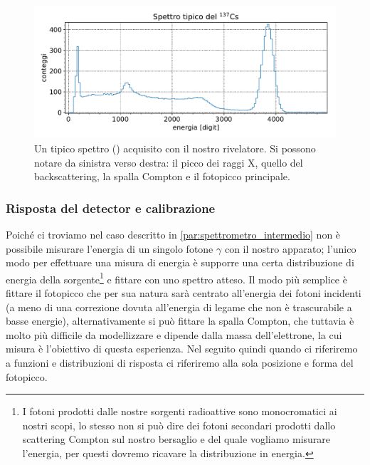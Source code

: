  \begin{figure}[h]
	\centering
	\includegraphics[width=\textwidth]{spettro_tipico}
	\caption{\label{fig:spettro_tipico}Un tipico spettro (\cs) acquisito con il nostro rivelatore. Si possono notare da sinistra verso destra: il picco dei raggi X, quello del backscattering, la spalla Compton e il fotopicco principale.}
\end{figure}


 \subsubsection{Risposta del detector e calibrazione}
 Poiché ci troviamo nel caso descritto in \autoref{par:spettrometro_intermedio} non è possibile misurare l'energia di un singolo fotone $\gamma$ con il nostro apparato; l'unico modo per effettuare una misura di energia è supporre una certa distribuzione di energia della sorgente\footnote{I fotoni prodotti dalle nostre sorgenti radioattive sono monocromatici ai nostri scopi, lo stesso non si può dire dei fotoni secondari prodotti dallo scattering Compton sul nostro bersaglio e del quale vogliamo misurare l'energia, per questi dovremo ricavare la distribuzione in energia.} e fittare con uno spettro atteso.
 Il modo più semplice è fittare il fotopicco che per sua natura sarà centrato all'energia dei fotoni incidenti (a meno di una correzione dovuta all'energia di legame che non è trascurabile a basse energie), alternativamente si può fittare la spalla Compton, che tuttavia è molto più difficile da modellizzare e dipende dalla massa dell'elettrone, la cui misura è l'obiettivo di questa esperienza. Nel seguito quindi quando ci riferiremo a funzioni e distribuzioni di risposta ci riferiremo alla sola posizione e forma del fotopicco.

